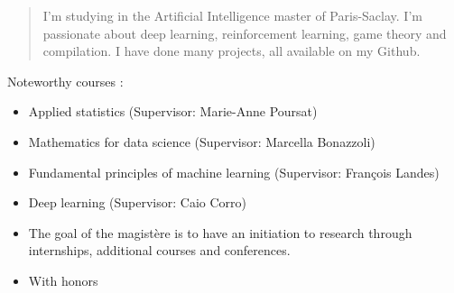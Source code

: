 \documentclass[10pt,a4paper,ragged2e,withhyper]{altacv}
\begin{document}
\begin{paracol}{2}
        
        
        \newpage
        
        \switchcolumn
        
            \begin{quote}
              I'm studying in the Artificial Intelligence master of Paris-Saclay.
              I'm passionate about deep learning, reinforcement learning, game theory
              and compilation.
              I have done many projects, all available on my Github.
            \end{quote}
        
        
            Noteworthy courses :
            \vspace{2pt}
            \begin{itemize}
              \item Applied statistics (Supervisor: Marie-Anne Poursat)
              \item Mathematics for data science (Supervisor: Marcella Bonazzoli)
              \item Fundamental principles of machine learning (Supervisor: François Landes)
              \item Deep learning (Supervisor: Caio Corro)
            \end{itemize}
            \divider

            \begin{itemize}
              \item The goal of the magistère is to have an initiation to research through internships, additional courses and conferences.
              \item With honors
            \end{itemize}
            \divider


\end{paracol}
\end{document}
